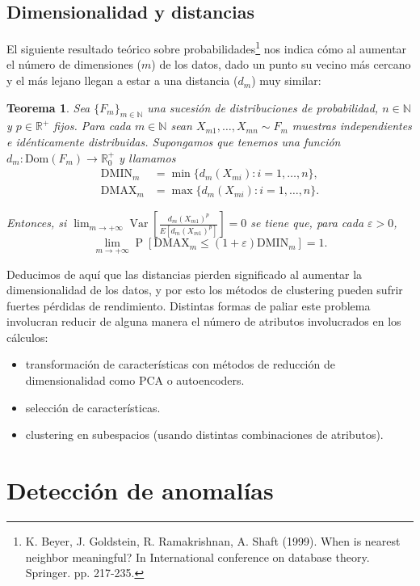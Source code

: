 \documentclass[a4paper,11pt,spanish]{report}
\let\stdchapter\chapter
\let\stdsection\section
\let\stdsub\subsection
\let\stdsubsub\subsubsection
\renewcommand{\part}{\stdchapter}
\renewcommand{\chapter}{\stdsection}
\renewcommand{\section}{\stdsub}
\renewcommand{\subsection}{\stdsubsub}
\newtheorem{thm}{Teorema}[chapter]
\begin{document}
\chapter{Dimensionalidad y distancias}
\label{sec-1-5}

El siguiente resultado teórico sobre probabilidades\footnote{K. Beyer, J. Goldstein, R. Ramakrishnan, A. Shaft (1999). When is nearest neighbor meaningful? In International conference on database theory. Springer. pp. 217-235.} nos indica cómo al aumentar el número de dimensiones ($m$) de los datos, dado un punto su vecino más cercano y el más lejano llegan a estar a una distancia ($d_m$) muy similar:

\begin{thm}
\label{th:dim-curse}
Sea \(\{F_{m}\}_{m\in\mathbb N}\) una sucesión de distribuciones de
probabilidad, \(n\in \mathbb N\) y \(p\in\mathbb R^+\) fijos. Para cada
\(m\in\mathbb{N}\) sean \(X_{m1},\dots,X_{mn}\sim F_m\) muestras independientes
e idénticamente distribuidas. Supongamos que tenemos una función
\(d_m:\mathrm{Dom}(F_m)\rightarrow \mathbb R^+_0\) y llamamos
\begin{align*}
  \mathrm{DMIN}_{m}&=\min\{d_m(X_{mi}):i=1,\dots,n\},\\
  \mathrm{DMAX}_{m}&=\max\{d_m(X_{mi}):i=1,\dots,n\}.
\end{align*}

Entonces, si
\(\lim_{m\rightarrow +\infty}
\operatorname{Var}\left[\frac{d_m(X_{m1})^p}{E[d_m(X_{m1})^p]}\right]=0\)
se tiene que, para cada \(\varepsilon > 0\),
\[\lim_{m\rightarrow +\infty}\operatorname{P}[\mathrm{DMAX}_m\leq (1+\varepsilon) \mathrm{DMIN}_m]=1.\]
\end{thm}

Deducimos de aquí que las distancias pierden significado al aumentar la dimensionalidad de los datos, y por esto los métodos de clustering pueden sufrir fuertes pérdidas de rendimiento. Distintas formas de paliar este problema involucran reducir de alguna manera el número de atributos involucrados en los cálculos:
\begin{itemize}
\item transformación de características con métodos de reducción de dimensionalidad como PCA o autoencoders.
\item selección de características.
\item clustering en subespacios (usando distintas combinaciones de atributos).
\end{itemize}

\part{Detección de anomalías}
\label{sec-2}
\end{document}
